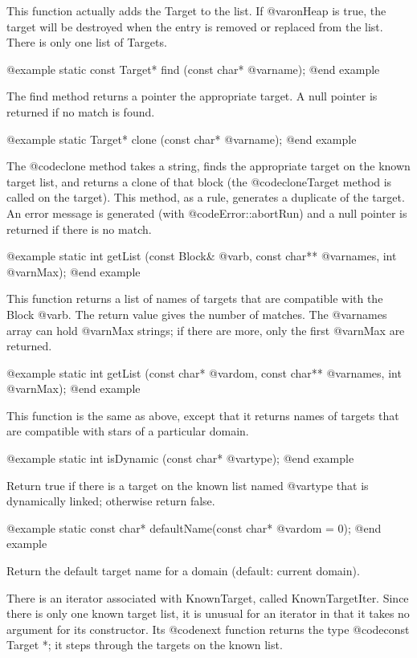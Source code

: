 This function actually adds the Target to the list.  If @var{onHeap} is true,
the target will be destroyed when the entry is removed or replaced from
the list.  There is only one list of Targets.

@example
static const Target* find (const char* @var{name});
@end example

The find method returns a pointer the appropriate target.
A null pointer is returned if no match
is found.

@example
static Target* clone (const char* @var{name});
@end example

The @code{clone} method takes a string, finds the appropriate target on
the known target list, and returns a clone of that block (the
@code{cloneTarget} method is called on the target).  This method, as
a rule, generates a duplicate of the target.
An error message is generated (with @code{Error::abortRun}) and
a null pointer is returned if there is no match.

@example
static int getList (const Block& @var{b}, const char** @var{names}, int @var{nMax});
@end example

This function returns a list of names of targets that are compatible
with the Block @var{b}.  The return value gives the number of matches.
The @var{names} array can hold @var{nMax} strings; if there are more,
only the first @var{nMax} are returned.

@example
static int getList (const char* @var{dom}, const char** @var{names}, int @var{nMax});
@end example

This function is the same as above, except that it returns names of
targets that are compatible with stars of a particular domain.

@example
static int isDynamic (const char* @var{type});
@end example

Return true if there is a target on the known list named @var{type}
that is dynamically linked; otherwise return false.

@example
static const char* defaultName(const char* @var{dom} = 0);
@end example

Return the default target name for a domain (default: current domain).

There is an iterator associated with KnownTarget, called
KnownTargetIter.  Since there is only one known target list, it is
unusual for an iterator in that it takes no argument for its constructor.
Its @code{next} function returns the type @code{const Target *}; it
steps through the targets on the known list.

